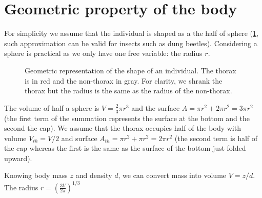 \documentclass[12pt]{article}
\begin{document}
\section{Geometric property of the body}
For simplicity we assume that the individual is shaped as a the half of sphere (\cref{fig:geo}, such approximation can be valid for insects such as dung beetles).
Considering a sphere is practical as we only have one free variable:  the radius $r$.
\begin{figure}
\begin{center}
	\caption{Geometric representation of the shape of an individual.
	The thorax is in red and the non-thorax in gray.  
	For clarity, we shrank the thorax but the radius is the same as the radius of the non-thorax.
	}
	\label{fig:geo}
\end{center}
\end{figure}
The volume of half a sphere is $V = \frac{2}{3} \pi r^3$ and the surface $A = \pi r^2 + 2 \pi r^ 2 = 3 \pi r^2$ (the first term of the summation represents the surface at the bottom and the second the cap).
We assume that the thorax occupies half of the body with volume $V_{th} = V/2$ and surface $A_{th} = \pi r^2 + \pi r^2 = 2 \pi r^2$ (the second term is half of the cap whereas the first is the same as the surface of the bottom just folded upward).
  
Knowing body mass $z$ and density $d$, we can convert mass into volume $ V = z/d$.
The radius $r = \left( \frac{3V}{2 \pi} \right)^{1/3}$ 
\end{document}

